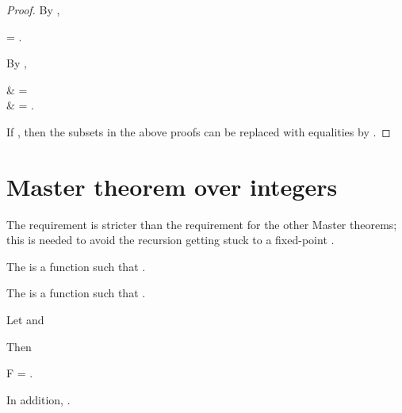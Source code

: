 \documentclass[b5paper, english, oneside]{memoir}
\begin{document}
\begin{proof}
\proofpart{}
By ,
\begin{eqs}
 = .
\end{eqs}
By ,
\begin{eqs}
 & =  \\ 
{} & = .
\end{eqs}

\proofpart{}
If , then the subsets in the above proofs can be replaced with equalities by .
\end{proof}

\section{Master theorem over integers}

\ReMasterFunctionOverIntegers

\begin{note}
The requirement  is stricter than the requirement  for the other Master theorems; this is needed to avoid the recursion getting stuck to a fixed-point . 
\end{note}

\begin{definition}
The  is a function   such that . 
\end{definition}

\begin{definition}
The  is a function  such that .
\end{definition}

\begin{theorem}
\label{FixedPointsOfCeilingDivision}
Let  and

Then
\begin{eqs}
F = .
\end{eqs}
In addition, .
\end{theorem}
\end{document}
